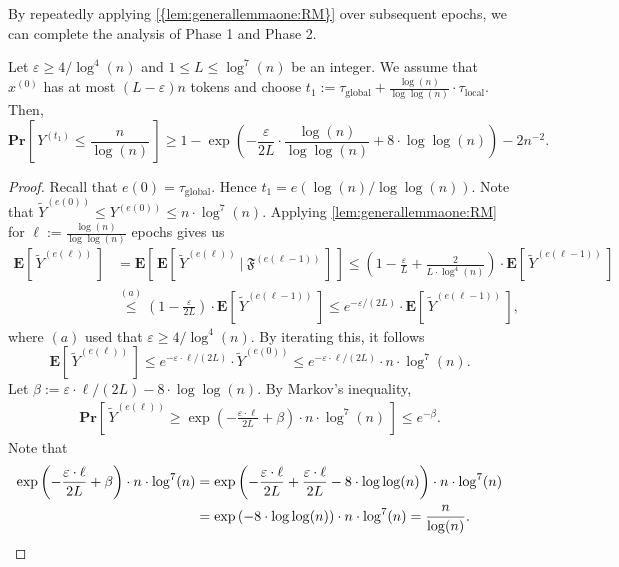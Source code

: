 \documentclass[twoside,leqno]{article}
\newcommand{\Pro}[1]{\mathbf{Pr} \left[\,#1\,\right]}
\newcommand{\Ex}[1]{\mathbf{E} \left[\,#1\,\right]}
\DeclareMathOperator{\1}{\mathbf{1}}
\newcommand{\taulocal}{\tau_{\mathrm{local}}}
\newcommand{\tauglobal}{\tau_{\mathrm{global}}}
\numberwithin{equation}{section}
\let\epsilon\varepsilon
\newcommand{\newL}{L}
\begin{document}
By repeatedly applying \cref{{lem:generallemmaone:RM}} over subsequent epochs, we can complete the analysis of Phase 1 and Phase 2.
\begin{lemma}[Phase 1]
\label{lem:rmlemmaphaseone}
      Let $ \epsilon\ge 4/\log^4 (n)$ and $1 \leq \newL \leq \log^7(n)$ be an integer. We assume that $x^{(0)}$ has at most $(L-\epsilon)n$ tokens and choose $t_1:=\tauglobal+\frac{
      \log(n)}{\log \log (n)} \cdot \taulocal$. Then,
\[
\Pro{ Y^{(t_1)} \le \frac{n}{\log(n)}} \ge 1-\exp\left(-\frac{\epsilon}{2\newL} \cdot \frac{\log (n)}{\log \log (n)} 
+ 8\cdot \log \log (n)\right)- 2 n^{-2}.
\]
\end{lemma}
\begin{proof}
Recall that $e(0)=\tauglobal$. Hence $t_1=e(\log(n)/\log\log(n))$.
Note that $\widetilde{Y}^{(e(0))}\le Y^{(e(0))} \leq n\cdot \log^7(n) $.
Applying \cref{lem:generallemmaone:RM} for $\ell:=\frac{\log (n)}{\log \log(n)}$ epochs gives us
\begin{align*}
\Ex{ \tilde{Y}^{(e(\ell))}} &= \Ex{\Ex{ \tilde{Y}^{(e(\ell))} ~\Big|~ \mathfrak{F}^{(e(\ell-1))}} }
\leq \left(1 - \frac{\epsilon}{\newL} + \frac{2}{\newL \cdot \log^4(n)} \right) \cdot \Ex{\tilde{Y}^{(e(\ell-1))}}\nonumber \\& \stackrel{(a)}{\le} \left(
1-\frac{\epsilon}{2\newL}\right) \cdot \Ex{\tilde{Y}^{(e(\ell-1))}} \leq e^{-\epsilon/(2\newL)}\cdot \Ex{\tilde{Y}^{(e(\ell-1))}},
\end{align*}
where $(a)$ used that $\epsilon \geq 4/\log^4(n)$. By iterating this, it follows 
$$\Ex{ \tilde{Y}^{(e(\ell))}} \leq e^{-\epsilon \cdot \ell/(2\newL) } \cdot \widetilde{Y}^{(e(0))} \leq e^{-\epsilon \cdot \ell/(2 \newL)}\cdot n \cdot  \log^7 (n).$$
Let $\beta:=\epsilon \cdot \ell/(2\newL) - 8\cdot \log\log (n)$. By Markov's inequality,
\begin{align}
\Pro{ \tilde{Y}^{(e(\ell))} \geq \exp\left(-\frac{\epsilon \cdot \ell}{2L}   + \beta\right)\cdot  n \cdot \log^7(n)} \leq e^{-\beta}. \label{eq:tilteY:first}
\end{align}
 Note that
\begin{align}
\exp\left(-\frac{\epsilon \cdot \ell}{2\newL}  +\beta\right)\cdot n\cdot \log^7 (n) &= \exp\left(-\frac{\epsilon\cdot \ell}{2 \newL}+\frac{\epsilon\cdot \ell}{2 \newL} -  8\cdot \log\log(n)\right)\cdot n\cdot \log^7 (n)\notag
\\& = \exp\left(- 8\cdot \log \log(n)\right)\cdot n\cdot \log^7 (n) \notag
=  \frac{n}{\log (n)} \label{eq:nlognApprox}\notag.

\end{align}
\end{proof}
\end{document}
